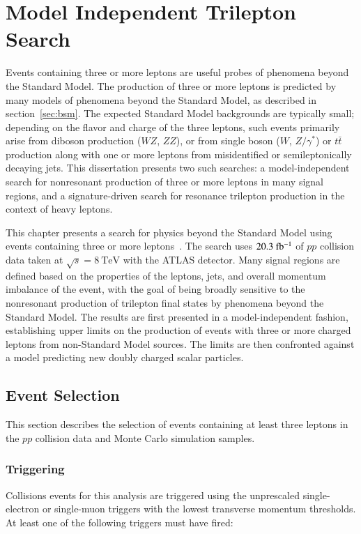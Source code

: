 \chapter{Model Independent Trilepton Search}\label{ch:model-independent-trilepton-search}

Events containing three or more leptons are useful probes of phenomena beyond the Standard Model. The production of three or more leptons is predicted by many models of phenomena beyond the Standard Model, as described in section~\ref{sec:bsm}. The expected Standard Model backgrounds are typically small; depending on the flavor and charge of the three leptons, such events primarily arise from diboson production ($WZ$, $ZZ$), or from single boson ($W$, $Z/\gamma^{*}$) or $t\bar{t}$ production along with one or more leptons from misidentified or semileptonically decaying jets.  This dissertation presents two such searches: a model-independent search for nonresonant production of three or more leptons in many signal regions, and a signature-driven search for resonance trilepton production in the context of heavy leptons. 

This chapter presents a search for physics beyond the Standard Model using events containing three or more leptons~\cite{Aad:2014hja}. The search uses $20.3~\mbox{fb$^{-1}$}$ of $pp$ collision data taken at $\sqrt{s}=8~\mbox{TeV}$ with the ATLAS detector. Many signal regions are defined based on the properties of the leptons, jets, and overall momentum imbalance of the event, with the goal of being broadly sensitive to the nonresonant production of trilepton final states by phenomena beyond the Standard Model. The results are first presented in a model-independent fashion, establishing upper limits on the production of events with three or more charged leptons from non-Standard Model sources. The limits are then confronted against a model predicting new doubly charged scalar particles. 

\section{Event Selection}\label{sec:model-independent-event-selection}

This section describes the selection of events containing at least three leptons in the $pp$ collision data and Monte Carlo simulation samples. 

\subsection{Triggering}\label{sec:model-independent-event-selection-triggering}
Collisions events for this analysis are triggered using the unprescaled single-electron or single-muon triggers with the lowest transverse momentum thresholds. At least one of the following triggers must have fired:

